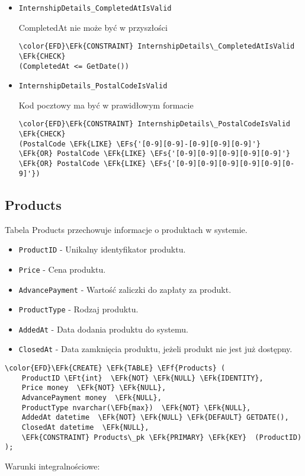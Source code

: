 \documentclass[11pt]{article}
\newcommand{\EFs}[1]{\textcolor{EFs}{#1}} %
\newcommand{\EFk}[1]{\textcolor{EFk}{\textbf{#1}}} %
\newcommand{\EFb}[1]{\textcolor{EFb}{\textbf{#1}}} %
\newcommand{\EFf}[1]{\textcolor{EFf}{#1}} %
\newcommand{\EFt}[1]{\textcolor{EFt}{\textbf{#1}}} %
\begin{document}
\begin{itemize}
\item \texttt{InternshipDetails\_CompletedAtIsValid}

CompletedAt nie może być w przyszłości
\begin{Code}
\begin{Verbatim}
\color{EFD}\EFk{CONSTRAINT} InternshipDetails\_CompletedAtIsValid \EFk{CHECK}
(CompletedAt <= GetDate())
\end{Verbatim}
\end{Code}
\item \texttt{InternshipDetails\_PostalCodeIsValid}

Kod pocztowy ma być w prawidłowym formacie
\begin{Code}
\begin{Verbatim}
\color{EFD}\EFk{CONSTRAINT} InternshipDetails\_PostalCodeIsValid \EFk{CHECK}
(PostalCode \EFk{LIKE} \EFs{'[0-9][0-9]-[0-9][0-9][0-9]'}
\EFk{OR} PostalCode \EFk{LIKE} \EFs{'[0-9][0-9][0-9][0-9][0-9]'}
\EFk{OR} PostalCode \EFk{LIKE} \EFs{'[0-9][0-9][0-9][0-9][0-9][0-9]'})
\end{Verbatim}
\end{Code}
\end{itemize}
\subsection{Products}
\label{sec:orge475725}
Tabela Products przechowuje informacje o produktach w systemie.
\begin{itemize}
\item \texttt{ProductID} - Unikalny identyfikator produktu.
\item \texttt{Price} - Cena produktu.
\item \texttt{AdvancePayment} - Wartość zaliczki do zapłaty za produkt.
\item \texttt{ProductType} - Rodzaj produktu.
\item \texttt{AddedAt} - Data dodania produktu do systemu.
\item \texttt{ClosedAt} - Data zamknięcia produktu, jeżeli produkt nie jest już dostępny.
\end{itemize}
\begin{Code}
\begin{Verbatim}
\color{EFD}\EFk{CREATE} \EFk{TABLE} \EFf{Products} (
    ProductID \EFt{int}  \EFk{NOT} \EFk{NULL} \EFk{IDENTITY},
    Price money  \EFk{NOT} \EFk{NULL},
    AdvancePayment money  \EFk{NULL},
    ProductType nvarchar(\EFb{max})  \EFk{NOT} \EFk{NULL},
    AddedAt datetime  \EFk{NOT} \EFk{NULL} \EFk{DEFAULT} GETDATE(),
    ClosedAt datetime  \EFk{NULL},
    \EFk{CONSTRAINT} Products\_pk \EFk{PRIMARY} \EFk{KEY}  (ProductID)
);
\end{Verbatim}
\end{Code}
Warunki integralnościowe:
\end{document}
